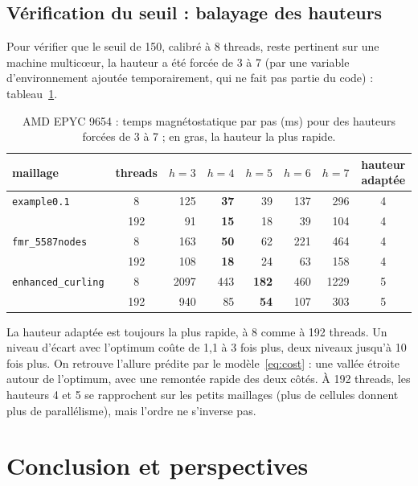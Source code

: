 \documentclass[11pt,a4paper]{article}
\newcommand{\code}[1]{\texttt{#1}}
\begin{document}
\subsection{Vérification du seuil : balayage des hauteurs}

Pour vérifier que le seuil de 150, calibré à 8 threads, reste pertinent sur une machine
multicœur, la hauteur a été forcée de 3 à 7 (par une variable d'environnement ajoutée
temporairement, qui ne fait pas partie du code) : tableau~\ref{tab:scan}.

\begin{table}[htbp]
\centering
\caption{AMD EPYC 9654 : temps magnétostatique par pas (ms) pour des hauteurs forcées de 3 à 7 ; en gras, la hauteur la plus rapide.}
\label{tab:scan}
\begin{tabular}{lcrrrrrc}
\toprule
maillage & threads & $h = 3$ & $h = 4$ & $h = 5$ & $h = 6$ & $h = 7$ & hauteur adaptée \\
\midrule
\code{example0.1}        & 8   & 125  & \textbf{37} & 39           & 137 & 296  & 4 \\
                         & 192 & 91   & \textbf{15} & 18           & 39  & 104  & 4 \\
\code{fmr\_5587nodes}    & 8   & 163  & \textbf{50} & 62           & 221 & 464  & 4 \\
                         & 192 & 108  & \textbf{18} & 24           & 63  & 158  & 4 \\
\code{enhanced\_curling} & 8   & 2097 & 443         & \textbf{182} & 460 & 1229 & 5 \\
                         & 192 & 940  & 85          & \textbf{54}  & 107 & 303  & 5 \\
\bottomrule
\end{tabular}
\end{table}

La hauteur adaptée est toujours la plus rapide, à 8 comme à 192 threads. Un niveau d'écart avec
l'optimum coûte de 1,1 à 3 fois plus, deux niveaux jusqu'à 10 fois plus. On retrouve
l'allure prédite par le modèle~\eqref{eq:cost} : une vallée étroite autour de l'optimum, avec une
remontée rapide des deux côtés. À 192 threads, les hauteurs 4 et 5 se rapprochent sur les petits
maillages (plus de cellules donnent plus de parallélisme), mais l'ordre ne s'inverse pas.

\section{Conclusion et perspectives}
\end{document}
